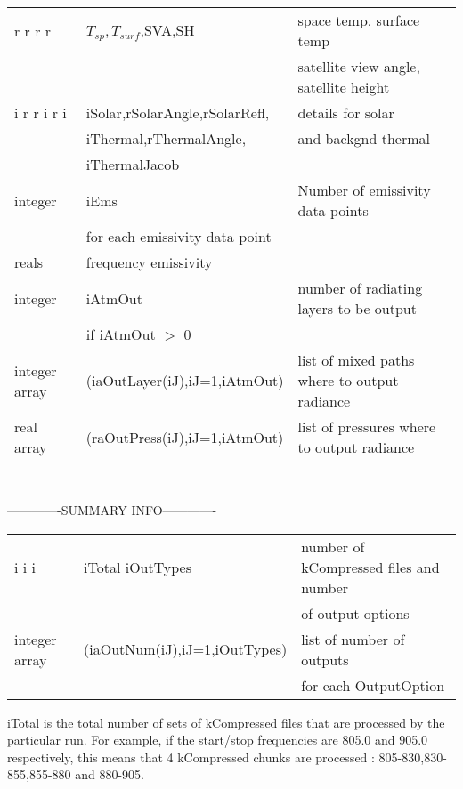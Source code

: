 \documentclass[12pt]{article}
\newlength{\colwidth}
\begin{document}
{{{{\begin{small}
\begin{longtable}{llp{\colwidth}}
{\sf r r r r} &\indent $T_{sp},T_{surf}$,SVA,SH &space temp, surface temp\\
              &          &  satellite view angle, satellite height\\
{\sf i r r i r i} &\indent iSolar,rSolarAngle,rSolarRefl,& details for solar\\
                  &\indent iThermal,rThermalAngle,  &and backgnd thermal\\
                  &\indent iThermalJacob & \\
{\sf integer} & \indent iEms & Number of emissivity data points\\
              & \indent for each emissivity data point &\\
{\sf reals}   & \indent \indent frequency emissivity &\\
{\sf integer} & \indent iAtmOut & number of radiating layers to be output\\
              & \indent if iAtmOut $>$ 0 & \\
{\sf integer array}  & \indent \indent (iaOutLayer(iJ),iJ=1,iAtmOut) &list 
  of mixed paths where to output radiance\\
{\sf real array}     & \indent \indent (raOutPress(iJ),iJ=1,iAtmOut) &list 
  of pressures where to output radiance\\\
\end{longtable}
\end{small}
-------------SUMMARY INFO-------------\\
\begin{small}
\begin{longtable}{llp{\colwidth}}
{\sf i i i} & \indent iTotal iOutTypes &number of kCompressed files and 
                                       number\\
            & &                        of output options\\
{\sf integer array}  & \indent \indent (iaOutNum(iJ),iJ=1,iOutTypes) 
    &list   of number of outputs \\
    &        & for each OutputOption\\
\end{longtable}
\end{small}

iTotal is the total number of sets of kCompressed files that are processed by
the particular run. For example, if the start/stop frequencies are 805.0 and 
905.0 respectively, this means that 4 kCompressed chunks are processed : 
805-830,830-855,855-880 and 880-905. \\

}}}}
\end{document}
